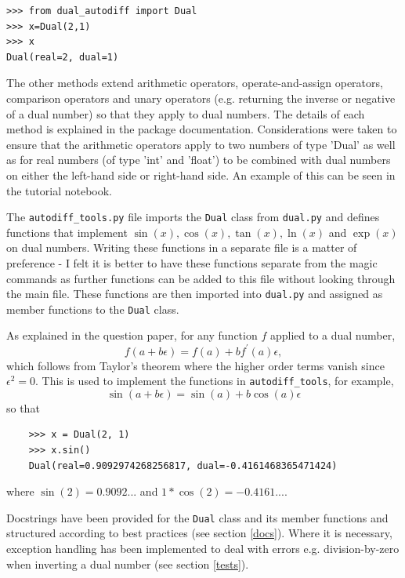 \documentclass{article}
\begin{document}
\begin{lstlisting}
>>> from dual_autodiff import Dual
>>> x=Dual(2,1)
>>> x
Dual(real=2, dual=1)
\end{lstlisting}

The other methods extend arithmetic operators, operate-and-assign operators, comparison operators and unary operators (e.g. returning the inverse or negative of a dual number) so that they apply to dual numbers. The details of each method is explained in the package documentation. Considerations were taken to ensure that the arithmetic operators apply to two numbers of type 'Dual' as well as for real numbers (of type 'int' and 'float') to be combined with dual numbers on either the left-hand side or right-hand side. An example of this can be seen in the tutorial notebook.

The \texttt{autodiff\_tools.py} file imports the \texttt{Dual} class from \texttt{dual.py} and defines functions that implement $\sin(x), \cos(x), \tan(x), \ln(x)$ and $\exp(x)$ on dual numbers. Writing these functions in a separate file is a matter of preference - I felt it is better to have these functions separate from the magic commands as further functions can be added to this file without looking through the main file. These functions are then imported into \texttt{dual.py} and assigned as member functions to the \texttt{Dual} class.

As explained in the question paper, for any function $f$ applied to a dual number,
\[
f(a+b\epsilon) = f(a) + b f^\prime (a) \epsilon,
\]
which follows from Taylor's theorem where the higher order terms vanish since $\epsilon^2 =0$. This is used to implement the functions in \texttt{autodiff\_tools}, for example, 
\[
\sin(a+b\epsilon) = \sin(a) + b \cos(a) \epsilon
\]
so that 
\begin{lstlisting}
    >>> x = Dual(2, 1)
    >>> x.sin()
    Dual(real=0.9092974268256817, dual=-0.4161468365471424)
\end{lstlisting}
where $\sin(2)=0.9092...$ and $1*\cos(2)=-0.4161...$.

Docstrings have been provided for the \texttt{Dual} class and its member functions and structured according to best practices (see section \ref{docs}). Where it is necessary, exception handling has been implemented to deal with errors e.g. division-by-zero when inverting a dual number (see section \ref{tests}).
\end{document}
